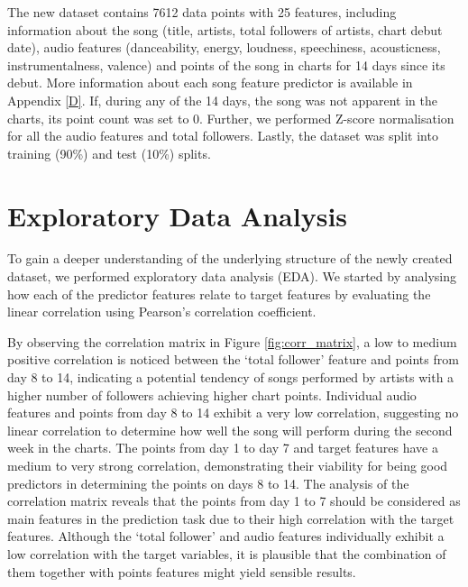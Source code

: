 \documentclass{article}
\begin{document}
The new dataset contains 7612 data points with 25 features, including information about the song (title, artists, total followers of artists, chart debut date), audio features (danceability, energy, loudness, speechiness, acousticness,
instrumentalness, valence) and points of the song in charts for 14 days since its debut. More information about each song feature predictor is available in Appendix \ref{D}. If, during any of the 14 days, the song was not apparent in the charts, its point count was set to 0.
Further, we performed Z-score normalisation for all the audio features and total followers. Lastly, the dataset was split into training (90\%) and test (10\%) splits.

\section{Exploratory Data Analysis} \label{EDA}

To gain a deeper understanding of the underlying structure of the newly created dataset, we performed exploratory data analysis (EDA). 
We started by analysing how each of the predictor features relate to target features by evaluating the linear correlation using Pearson’s correlation coefficient.

By observing the correlation matrix in Figure \ref{fig:corr_matrix}, a low to medium positive correlation is noticed between the ‘total follower’ feature and points from day 8 to 14, indicating a potential tendency of songs performed by artists with a higher number of followers achieving higher chart points. Individual audio features and points from day 8 to 14 exhibit a very low correlation, suggesting no linear correlation to determine how well the song will perform during the second week in the charts. The points from day 1 to day 7 and target features have a medium to very strong correlation, demonstrating their viability for being good predictors in determining the points on days 8 to 14. The analysis of the correlation matrix reveals that the points from day 1 to 7 should be considered as main features in the prediction task due to their high correlation with the target features. Although the ‘total follower’ and audio features individually exhibit a low correlation with the target variables, it is plausible that the combination of them together with points features might yield sensible results.
\end{document}
